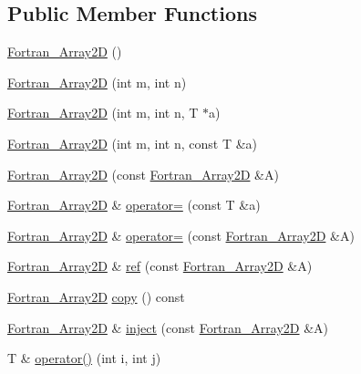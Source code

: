 \subsection*{Public Member Functions}
\begin{DoxyCompactItemize}
\item 
\hyperlink{classTNT_1_1Fortran__Array2D_a6c439794238043682b4b5901521534ac}{Fortran\-\_\-\-Array2\-D} ()
\item 
\hyperlink{classTNT_1_1Fortran__Array2D_af5d192c5865a587f3e49de6e321c6483}{Fortran\-\_\-\-Array2\-D} (int m, int n)
\item 
\hyperlink{classTNT_1_1Fortran__Array2D_a8953e98e6c7ebdfaec743be1194638a0}{Fortran\-\_\-\-Array2\-D} (int m, int n, T $\ast$a)
\item 
\hyperlink{classTNT_1_1Fortran__Array2D_af81c83ddf0df807410c624814ee829c2}{Fortran\-\_\-\-Array2\-D} (int m, int n, const T \&a)
\item 
\hyperlink{classTNT_1_1Fortran__Array2D_ae4537235bf543fe4034f0e8e4ffbdfe7}{Fortran\-\_\-\-Array2\-D} (const \hyperlink{classTNT_1_1Fortran__Array2D}{Fortran\-\_\-\-Array2\-D} \&A)
\item 
\hyperlink{classTNT_1_1Fortran__Array2D}{Fortran\-\_\-\-Array2\-D} \& \hyperlink{classTNT_1_1Fortran__Array2D_ae9d02fc21095e4cd2fff9f479d52a2b4}{operator=} (const T \&a)
\item 
\hyperlink{classTNT_1_1Fortran__Array2D}{Fortran\-\_\-\-Array2\-D} \& \hyperlink{classTNT_1_1Fortran__Array2D_aa4aa0816e95aadc83366b9faa77ba643}{operator=} (const \hyperlink{classTNT_1_1Fortran__Array2D}{Fortran\-\_\-\-Array2\-D} \&A)
\item 
\hyperlink{classTNT_1_1Fortran__Array2D}{Fortran\-\_\-\-Array2\-D} \& \hyperlink{classTNT_1_1Fortran__Array2D_a3367c5ff1caa02a1f3676b125f2accf5}{ref} (const \hyperlink{classTNT_1_1Fortran__Array2D}{Fortran\-\_\-\-Array2\-D} \&A)
\item 
\hyperlink{classTNT_1_1Fortran__Array2D}{Fortran\-\_\-\-Array2\-D} \hyperlink{classTNT_1_1Fortran__Array2D_a962b44c80e673ebef604798a6a0c3f09}{copy} () const 
\item 
\hyperlink{classTNT_1_1Fortran__Array2D}{Fortran\-\_\-\-Array2\-D} \& \hyperlink{classTNT_1_1Fortran__Array2D_a893c3e37cf3f590705340c476bb75f3c}{inject} (const \hyperlink{classTNT_1_1Fortran__Array2D}{Fortran\-\_\-\-Array2\-D} \&A)
\item 
T \& \hyperlink{classTNT_1_1Fortran__Array2D_ad285fd42092b4815d69c2aad73a5bb30}{operator()} (int i, int j)
\item 

\end{DoxyCompactItemize}

